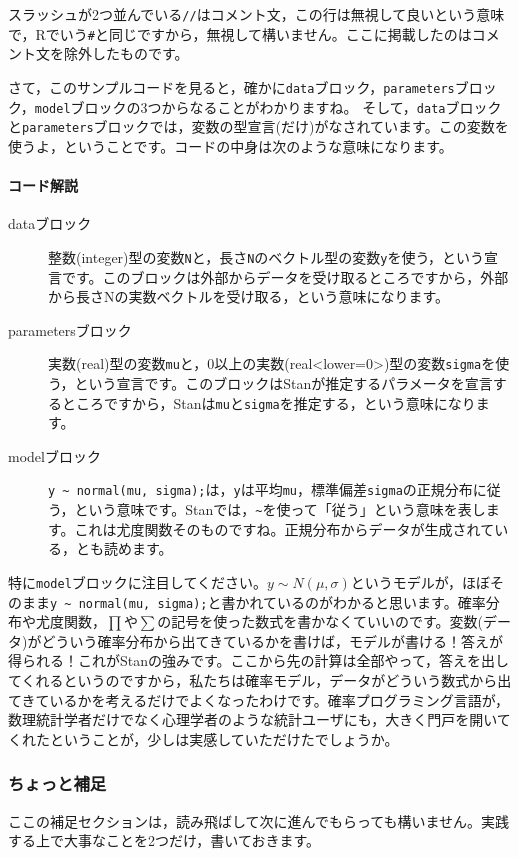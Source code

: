 \documentclass{ltjbook}
\begin{document}
スラッシュが2つ並んでいる\verb|//|はコメント文，この行は無視して良いという意味で，Rでいう\verb|#|と同じですから，無視して構いません。ここに掲載したのはコメント文を除外したものです。

さて，このサンプルコードを見ると，確かに\verb|data|ブロック，\verb|parameters|ブロック，\verb|model|ブロックの3つからなることがわかりますね。
そして，\verb|data|ブロックと\verb|parameters|ブロックでは，変数の型宣言(だけ)がなされています。この変数を使うよ，ということです。コードの中身は次のような意味になります。


\paragraph{コード解説}
\begin{description}
	\item[dataブロック] 整数(integer)型の変数\verb|N|と，長さ\verb|N|のベクトル型の変数\verb|y|を使う，という宣言です。このブロックは外部からデータを受け取るところですから，外部から長さNの実数ベクトルを受け取る，という意味になります。
	\item[parametersブロック] 実数(real)型の変数\verb|mu|と，0以上の実数(real<lower=0>)型の変数\verb|sigma|を使う，という宣言です。このブロックはStanが推定するパラメータを宣言するところですから，Stanは\verb|mu|と\verb|sigma|を推定する，という意味になります。
	\item[modelブロック] \verb|y ~ normal(mu, sigma);|は，\verb|y|は平均\verb|mu|，標準偏差\verb|sigma|の正規分布に従う，という意味です。Stanでは，\verb|~|を使って「従う」という意味を表します。これは尤度関数そのものですね。正規分布からデータが生成されている，とも読めます。
\end{description}

特に\verb|model|ブロックに注目してください。$y \sim N(\mu,\sigma)$というモデルが，ほぼそのまま\verb|y ~ normal(mu, sigma);|と書かれているのがわかると思います。確率分布や尤度関数，$\prod$や$\sum$の記号を使った数式を書かなくていいのです。変数(データ)がどういう確率分布から出てきているかを書けば，モデルが書ける！答えが得られる！これがStanの強みです。ここから先の計算は全部やって，答えを出してくれるというのですから，私たちは確率モデル，データがどういう数式から出てきているかを考えるだけでよくなったわけです。確率プログラミング言語が，数理統計学者だけでなく心理学者のような統計ユーザにも，大きく門戸を開いてくれたということが，少しは実感していただけたでしょうか。

\subsubsection{ちょっと補足}
ここの補足セクションは，読み飛ばして次に進んでもらっても構いません。実践する上で大事なことを2つだけ，書いておきます。
\end{document}
